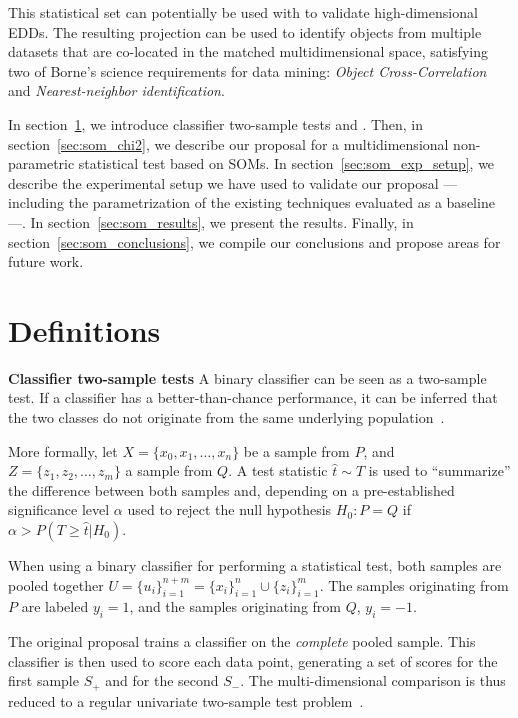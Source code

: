 This statistical set can potentially be used with \PresQ to validate
high-dimensional \glspl{EDD}. The resulting projection can be used to identify objects
from multiple datasets that are co-located in the matched multidimensional space, satisfying
two of Borne's science requirements for data mining: \emph{Object Cross-Correlation} and
\emph{Nearest-neighbor identification}.

In section~\ref{sec:som_definitions}, we introduce classifier two-sample tests
and . Then, in section~\ref{sec:som_chi2}, we describe our proposal
for a multidimensional non-parametric statistical test based on \glspl{SOM}.
In section~\ref{sec:som_exp_setup}, we describe the experimental setup we have used
to validate our proposal --- including the parametrization of the existing techniques
evaluated as a baseline ---. In section~\ref{sec:som_results}, we present the 
results.
Finally, in section~\ref{sec:som_conclusions}, we compile our conclusions and 
propose areas for future work.


\section{Definitions}
\label{sec:som_definitions}

\textbf{Classifier two-sample tests}
\label{sec:som_classifier2sample}
A binary classifier can be seen as a two-sample test. If a classifier has a better-than-chance
performance, it can be inferred that the two classes do not originate from the same underlying
population~\cite{friedman2004multivariate}. 

More formally, let $X = \{x_0,x_1,\ldots,x_n\}$  be a sample from $P$, and \linebreak
$Z = \{z_1,z_2,\ldots,z_m\}$ a sample from $Q$. A test statistic $\hat t \sim T$ is used to
``summarize'' the difference between both samples and, depending on a pre-established
significance level $\alpha$ used to reject the null hypothesis
$H_0: P = Q$ if $\alpha > P(T \ge \hat t | H_0)$.

When using a binary classifier for performing a statistical test, both samples are pooled
together $U = \{u_i\}_{i=1}^{n+m} = \{x_i\}_{i=1}^n \cup \{z_i\}_{i=1}^m$.
The samples originating from $P$ are labeled $y_i=1$, and the samples originating
from $Q$, $y_i=-1$.

The original proposal trains a classifier on the \emph{complete} pooled sample.
This classifier is then used to score each data point, generating a set of scores
for the first sample $S_+$ and for the second $S_-$. The multi-dimensional comparison
is thus reduced to a regular univariate two-sample test problem~\cite{friedman2004multivariate}.

